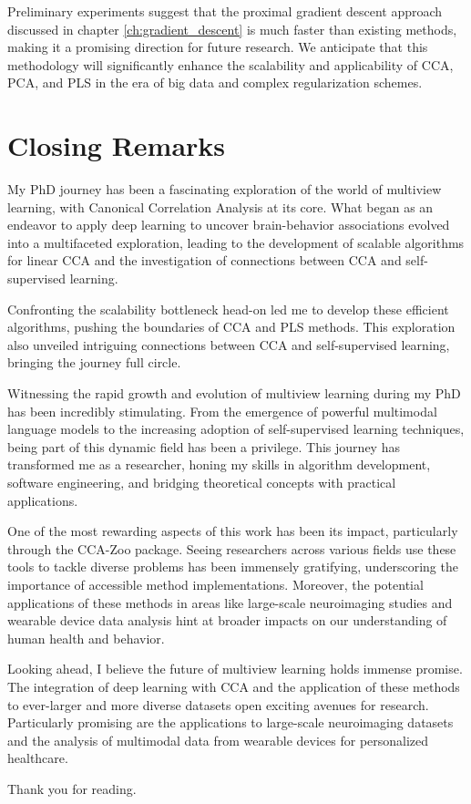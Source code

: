 Preliminary experiments suggest that the proximal gradient descent approach discussed in chapter \ref{ch:gradient_descent} is much faster than existing methods, making it a promising direction for future research. We anticipate that this methodology will significantly enhance the scalability and applicability of CCA, PCA, and PLS in the era of big data and complex regularization schemes.

\section{Closing Remarks}

My PhD journey has been a fascinating exploration of the world of multiview learning, with Canonical Correlation Analysis at its core. What began as an endeavor to apply deep learning to uncover brain-behavior associations evolved into a multifaceted exploration, leading to the development of scalable algorithms for linear CCA and the investigation of connections between CCA and self-supervised learning.

Confronting the scalability bottleneck head-on led me to develop these efficient algorithms, pushing the boundaries of CCA and PLS methods. This exploration also unveiled intriguing connections between CCA and self-supervised learning, bringing the journey full circle.

Witnessing the rapid growth and evolution of multiview learning during my PhD has been incredibly stimulating. From the emergence of powerful multimodal language models to the increasing adoption of self-supervised learning techniques, being part of this dynamic field has been a privilege. This journey has transformed me as a researcher, honing my skills in algorithm development, software engineering, and bridging theoretical concepts with practical applications.

One of the most rewarding aspects of this work has been its impact, particularly through the CCA-Zoo package. Seeing researchers across various fields use these tools to tackle diverse problems has been immensely gratifying, underscoring the importance of accessible method implementations. Moreover, the potential applications of these methods in areas like large-scale neuroimaging studies and wearable device data analysis hint at broader impacts on our understanding of human health and behavior.

Looking ahead, I believe the future of multiview learning holds immense promise. The integration of deep learning with CCA and the application of these methods to ever-larger and more diverse datasets open exciting avenues for research. Particularly promising are the applications to large-scale neuroimaging datasets and the analysis of multimodal data from wearable devices for personalized healthcare.

Thank you for reading.